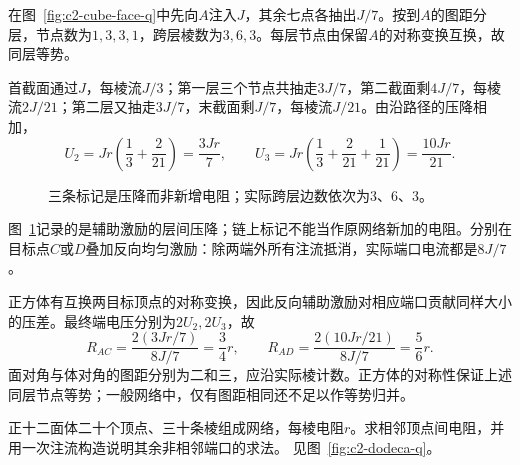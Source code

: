 \begin{solution}
在图~\ref{fig:c2-cube-face-q}中先向$A$注入$J$，其余七点各抽出$J/7$。按到$A$的图距分层，节点数为$1,3,3,1$，跨层棱数为$3,6,3$。每层节点由保留$A$的对称变换互换，故同层等势。

首截面通过$J$，每棱流$J/3$；第一层三个节点共抽走$3J/7$，第二截面剩$4J/7$，每棱流$2J/21$；第二层又抽走$3J/7$，末截面剩$J/7$，每棱流$J/21$。由沿路径的压降相加，
\[
 U_2=Jr\left(\frac13+\frac2{21}\right)=\frac{3Jr}7,
 \qquad U_3=Jr\left(\frac13+\frac2{21}+\frac1{21}\right)=\frac{10Jr}{21}.
\]
\begin{figure}[H]\centering
{}
\caption{三条标记是压降而非新增电阻；实际跨层边数依次为3、6、3。}\label{fig:c2-cube-face-s}
\end{figure}
图~\ref{fig:c2-cube-face-s}记录的是辅助激励的层间压降；链上标记不能当作原网络新加的电阻。分别在目标点$C$或$D$叠加反向均匀激励：除两端外所有注流抵消，实际端口电流都是$8J/7$。

正方体有互换两目标顶点的对称变换，因此反向辅助激励对相应端口贡献同样大小的压差。最终端电压分别为$2U_2,2U_3$，故
\[
 \boxed{R_{AC}=\frac{2(3Jr/7)}{8J/7}=\frac34r},\qquad
 \boxed{R_{AD}=\frac{2(10Jr/21)}{8J/7}=\frac56r}.
\]
面对角与体对角的图距分别为二和三，应沿实际棱计数。正方体的对称性保证上述同层节点等势；一般网络中，仅有图距相同还不足以作等势归并。
\end{solution}

\begin{example}[正十二面体的相邻端口]\label{ex:c2-dodeca}
正十二面体二十个顶点、三十条棱组成网络，每棱电阻$r$。求相邻顶点间电阻，并用一次注流构造说明其余非相邻端口的求法。 见图~\ref{fig:c2-dodeca-q}。
\end{example}

